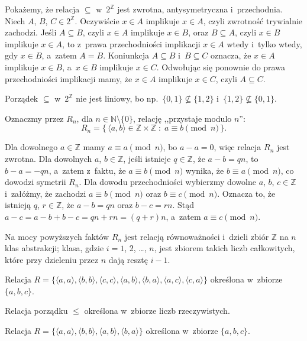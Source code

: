 
\exercise %
Pokażemy, że relacja $\subseteq$ w~$2^\mathbb{Z}$ jest zwrotna, antysymetryczna i~przechodnia.
Niech $A$, $B$, $C\in2^\mathbb{Z}$.
Oczywiście $x\in A$ implikuje $x\in A$, czyli zwrotność trywialnie zachodzi.
Jeśli $A\subseteq B$, czyli $x\in A$ implikuje $x\in B$, oraz $B\subseteq A$, czyli $x\in B$ implikuje $x\in A$, to z~prawa przechodniości implikacji $x\in A$ wtedy i~tylko wtedy, gdy $x\in B$, a~zatem $A=B$.
Koniunkcja $A\subseteq B$ i~$B\subseteq C$ oznacza, że $x\in A$ implikuje $x\in B$, a~$x\in B$ implikuje $x\in C$.
Odwołując się ponownie do prawa przechodniości implikacji mamy, że $x\in A$ implikuje $x\in C$, czyli $A\subseteq C$.

Porządek $\subseteq$ w~$2^\mathbb{Z}$ nie jest liniowy, bo np.\ $\{0,1\}\nsubseteq\{1,2\}$ i~$\{1,2\}\nsubseteq\{0,1\}$.

\exercise %
Oznaczmy przez $R_n$, dla $n\in\mathbb{N}\setminus\{0\}$, relację ,,przystaje modulo $n$'':
\[
	R_n = \bigl\{\,\langle a,b\rangle\in\mathbb{Z}\times\mathbb{Z}\;:\;a\equiv b\!\!\!\pmod{n}\,\bigr\}.
\]

Dla dowolnego $a\in\mathbb{Z}$ mamy $a\equiv a\pmod{n}$, bo $a-a=0$, więc relacja $R_n$ jest zwrotna.
Dla dowolnych $a$, $b\in\mathbb{Z}$, jeśli istnieje $q\in\mathbb{Z}$, że $a-b=qn$, to $b-a=-qn$, a~zatem z~faktu, że $a\equiv b\pmod{n}$ wynika, że $b\equiv a\pmod{n}$, co dowodzi symetrii $R_n$.
Dla dowodu przechodniości wybierzmy dowolne $a$, $b$, $c\in\mathbb{Z}$ i~załóżmy, że zachodzi $a\equiv b\pmod{n}$ oraz $b\equiv c\pmod{n}$.
Oznacza to, że istnieją $q$, $r\in\mathbb{Z}$, że $a-b=qn$ oraz $b-c=rn$.
Stąd $a-c=a-b+b-c=qn+rn=(q+r)n$, a~zatem $a\equiv c\pmod{n}$.

Na mocy powyższych faktów $R_n$ jest relacją równoważności i~dzieli zbiór $\mathbb{Z}$ na $n$ klas abstrakcji;  klasa, gdzie $i=1$, 2, \dots, $n$, jest zbiorem takich liczb całkowitych, które przy dzieleniu przez $n$ dają resztę $i-1$.

\exercise %
\subexercise
Relacja $R=\bigl\{\langle a,a\rangle,\langle b,b\rangle,\langle c,c\rangle,\langle a,b\rangle,\langle b,a\rangle,\langle a,c\rangle,\langle c,a\rangle\bigr\}$ określona w~zbiorze $\{a,b,c\}$.

\subexercise
Relacja porządku $\le$ określona w~zbiorze liczb rzeczywistych.

\subexercise
Relacja $R=\bigl\{\langle a,a\rangle,\langle b,b\rangle,\langle a,b\rangle,\langle b,a\rangle\bigr\}$ określona w~zbiorze $\{a,b,c\}$.

